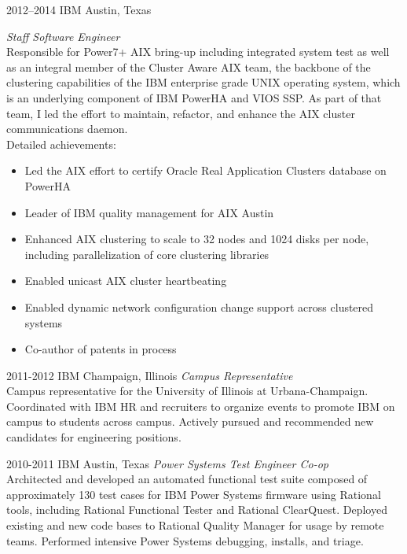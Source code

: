 \documentclass{friggeri-cv} %
\begin{document}
\begin{entrylist}
\entry
{2012--2014}
{IBM}
{Austin, Texas}
{\emph{Staff Software Engineer} \\
Responsible for Power7+ AIX bring-up including integrated system test as well as an integral member of the
Cluster Aware AIX team, the backbone of the clustering capabilities of the IBM enterprise grade UNIX operating system,
which is an underlying component of IBM PowerHA and VIOS SSP. As part of that team, I led the effort to maintain, refactor,
and enhance the AIX cluster communications daemon. \\
Detailed achievements:
\begin{itemize}
\item Led the AIX effort to certify Oracle Real Application Clusters database on PowerHA
\item Leader of IBM quality management for AIX Austin
\item Enhanced AIX clustering to scale to 32 nodes and 1024 disks per node, including parallelization of core clustering libraries
\item Enabled unicast AIX cluster heartbeating
\item Enabled dynamic network configuration change support across clustered systems
\item Co-author of patents in process
\end{itemize}}
\end{entrylist}
\begin{entrylist}
\entry
{2011-2012}
{IBM}
{Champaign, Illinois}
{\emph{Campus Representative} \\
Campus representative for the University of Illinois at Urbana-Champaign. Coordinated with IBM HR and recruiters to
organize events to promote IBM on campus to students across campus. Actively pursued and recommended new candidates for engineering positions.}
\end{entrylist}
\begin{entrylist}
\entry
{2010-2011}
{IBM}
{Austin, Texas}
{\emph{Power Systems Test Engineer Co-op} \\
Architected and developed an automated functional test suite composed of approximately 130 test cases for IBM Power Systems
firmware using Rational tools, including Rational Functional Tester and Rational ClearQuest. Deployed existing and new code bases to Rational Quality Manager for usage by remote teams. Performed intensive Power Systems debugging, installs, and triage.}
\end{entrylist}
\end{document}

